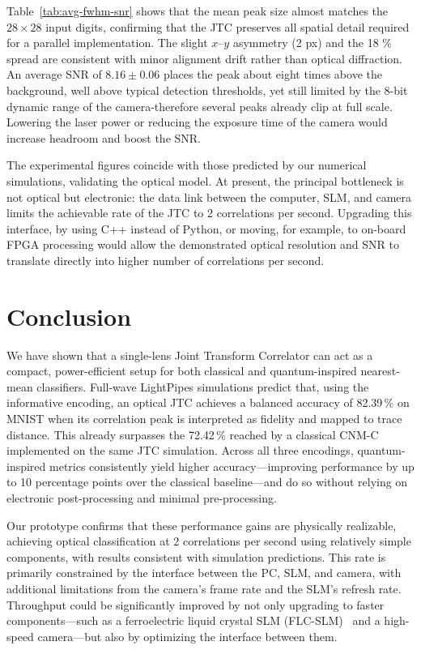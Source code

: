 \documentclass[twocolumn]{article} %
\begin{document}
Table~\ref{tab:avg-fwhm-snr} shows that the mean peak size almost matches the \(28\times28\) input
digits, confirming that the JTC preserves all spatial detail required
for a parallel implementation.  The slight \(x\)–\(y\) asymmetry
(2 px) and the 18 \% spread are consistent with minor alignment
drift rather than optical diffraction.  An average SNR of
\(8.16\pm0.06\) places the peak about eight times above the
background, well above typical detection thresholds, yet still limited
by the 8-bit dynamic range of the camera-therefore several peaks already clip at full
scale.  Lowering the laser power or reducing the exposure time of the camera would increase headroom and boost the SNR.

The experimental figures coincide with those predicted by our numerical
simulations, validating the optical model.  At present, the principal
bottleneck is not optical but electronic: the data link between the computer,
SLM, and camera limits the achievable rate of the JTC to 2 correlations per second.  Upgrading this interface, by using C++ instead of Python, or
moving, for example, to on-board FPGA processing would allow the demonstrated optical
resolution and SNR to translate directly into higher number of correlations per second.

\section{Conclusion}
\label{sec:conclusion}

We have shown that a single-lens Joint Transform Correlator can act as a compact, power-efficient setup for both classical and quantum-inspired nearest-mean classifiers.  
Full-wave LightPipes simulations predict that, using the informative encoding, an optical JTC achieves a balanced accuracy of 82.39\,\% on MNIST when its correlation peak is interpreted as fidelity and mapped to trace distance. This already surpasses the 72.42\,\% reached by a classical CNM-C implemented on the same JTC simulation.  
Across all three encodings, quantum-inspired metrics consistently yield higher accuracy—improving performance by up to 10 percentage points over the classical baseline—and do so without relying on electronic post-processing and minimal pre-processing.

Our prototype confirms that these performance gains are physically realizable, achieving optical classification at 2 correlations per second using relatively simple components, with results consistent with simulation predictions. This rate is primarily constrained by the interface between the PC, SLM, and camera, with additional limitations from the camera's frame rate and the SLM's refresh rate. Throughput could be significantly improved by not only upgrading to faster components—such as a ferroelectric liquid crystal SLM (FLC-SLM)~\cite{Wilkinson1998BinaryPOJTC} and a high-speed camera—but also by optimizing the interface between them. 
\end{document}
